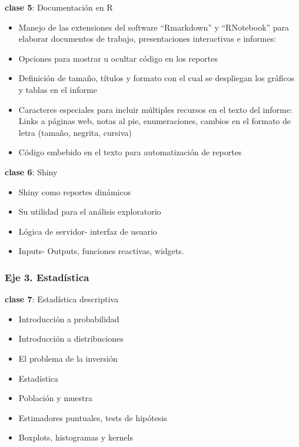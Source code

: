 \documentclass[]{book}
\providecommand{\tightlist}{%
  \setlength{\itemsep}{0pt}\setlength{\parskip}{0pt}}
\begin{document}
\textbf{clase 5}: Documentación en R

\begin{itemize}
\tightlist
\item
  Manejo de las extensiones del software ``Rmarkdown'' y ``RNotebook'' para elaborar documentos de trabajo, presentaciones interactivas e informes:
\item
  Opciones para mostrar u ocultar código en los reportes
\item
  Definición de tamaño, títulos y formato con el cual se despliegan los gráficos y tablas en el informe
\item
  Caracteres especiales para incluir múltiples recursos en el texto del informe: Links a páginas web, notas al pie, enumeraciones, cambios en el formato de letra (tamaño, negrita, cursiva)
\item
  Código embebido en el texto para automatización de reportes
\end{itemize}

\textbf{clase 6}: Shiny

\begin{itemize}
\tightlist
\item
  Shiny como reportes dinámicos
\item
  Su utilidad para el análisis exploratorio
\item
  Lógica de servidor- interfaz de usuario
\item
  Inputs- Outputs, funciones reactivas, widgets.
\end{itemize}

\hypertarget{eje-3.-estadistica}{%
\subsubsection*{\texorpdfstring{\textbf{Eje 3. Estadística}}{Eje 3. Estadística}}\label{eje-3.-estadistica}}

\textbf{clase 7}: Estadística descriptiva

\begin{itemize}
\tightlist
\item
  Introducción a probabilidad
\item
  Introducción a distribuciones
\item
  El problema de la inversión
\item
  Estadística
\item
  Población y muestra
\item
  Estimadores puntuales, tests de hipótesis
\item
  Boxplots, histogramas y kernels
\end{itemize}
\end{document}
